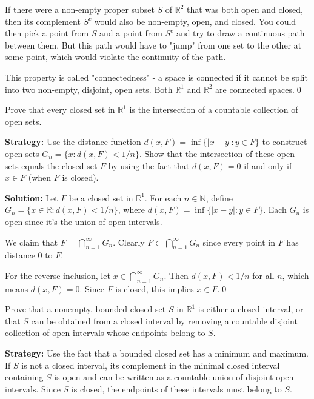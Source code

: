 If there were a non-empty proper subset $S$ of $\mathbb{R}^2$ that was both open and closed, then its complement $S^c$ would also be non-empty, open, and closed. You could then pick a point from $S$ and a point from $S^c$ and try to draw a continuous path between them. But this path would have to "jump" from one set to the other at some point, which would violate the continuity of the path.

This property is called "connectedness" - a space is connected if it cannot be split into two non-empty, disjoint, open sets. Both $\mathbb{R}^1$ and $\mathbb{R}^2$ are connected spaces.\qed


\begin{problembox}
Prove that every closed set in $\mathbb{R}^1$ is the intersection of a countable collection of open sets.
\end{problembox}

\noindent\textbf{Strategy:} Use the distance function $d(x,F) = \inf\{|x-y| : y \in F\}$ to construct open sets $G_n = \{x : d(x,F) < 1/n\}$. Show that the intersection of these open sets equals the closed set $F$ by using the fact that $d(x,F) = 0$ if and only if $x \in F$ (when $F$ is closed).

\bigskip\noindent\textbf{Solution:} Let $F$ be a closed set in $\mathbb{R}^1$. For each $n \in \mathbb{N}$, define $G_n = \{x \in \mathbb{R} : d(x,F) < 1/n\}$, where $d(x,F) = \inf\{|x-y| : y \in F\}$. Each $G_n$ is open since it's the union of open intervals.

We claim that $F = \bigcap_{n=1}^{\infty} G_n$. Clearly $F \subset \bigcap_{n=1}^{\infty} G_n$ since every point in $F$ has distance 0 to $F$.

For the reverse inclusion, let $x \in \bigcap_{n=1}^{\infty} G_n$. Then $d(x,F) < 1/n$ for all $n$, which means $d(x,F) = 0$. Since $F$ is closed, this implies $x \in F$.\qed


\begin{problembox}
Prove that a nonempty, bounded closed set $S$ in $\mathbb{R}^1$ is either a closed interval, or that $S$ can be obtained from a closed interval by removing a countable disjoint collection of open intervals whose endpoints belong to $S$.
\end{problembox}

\noindent\textbf{Strategy:} Use the fact that a bounded closed set has a minimum and maximum. If $S$ is not a closed interval, its complement in the minimal closed interval containing $S$ is open and can be written as a countable union of disjoint open intervals. Since $S$ is closed, the endpoints of these intervals must belong to $S$.

